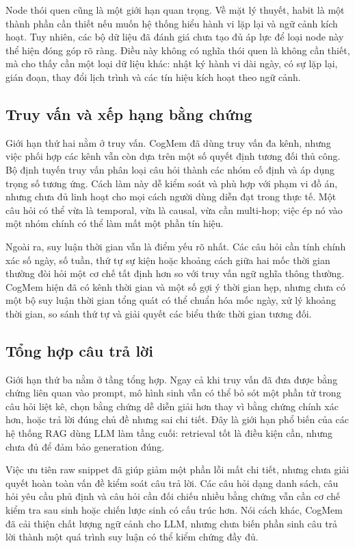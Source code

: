 \documentclass[../main.tex]{subfiles}
\begin{document}
Node thói quen cũng là một giới hạn quan trọng. Về mặt lý thuyết, habit là một thành phần cần thiết nếu muốn hệ thống hiểu hành vi lặp lại và ngữ cảnh kích hoạt. Tuy nhiên, các bộ dữ liệu đã đánh giá chưa tạo đủ áp lực để loại node này thể hiện đóng góp rõ ràng. Điều này không có nghĩa thói quen là không cần thiết, mà cho thấy cần một loại dữ liệu khác: nhật ký hành vi dài ngày, có sự lặp lại, gián đoạn, thay đổi lịch trình và các tín hiệu kích hoạt theo ngữ cảnh.

\subsection{Truy vấn và xếp hạng bằng chứng}

Giới hạn thứ hai nằm ở truy vấn. CogMem đã dùng truy vấn đa kênh, nhưng việc phối hợp các kênh vẫn còn dựa trên một số quyết định tương đối thủ công. Bộ định tuyến truy vấn phân loại câu hỏi thành các nhóm cố định và áp dụng trọng số tương ứng. Cách làm này dễ kiểm soát và phù hợp với phạm vi đồ án, nhưng chưa đủ linh hoạt cho mọi cách người dùng diễn đạt trong thực tế. Một câu hỏi có thể vừa là temporal, vừa là causal, vừa cần multi-hop; việc ép nó vào một nhóm chính có thể làm mất một phần tín hiệu.

Ngoài ra, suy luận thời gian vẫn là điểm yếu rõ nhất. Các câu hỏi cần tính chính xác số ngày, số tuần, thứ tự sự kiện hoặc khoảng cách giữa hai mốc thời gian thường đòi hỏi một cơ chế tất định hơn so với truy vấn ngữ nghĩa thông thường. CogMem hiện đã có kênh thời gian và một số gợi ý thời gian hẹp, nhưng chưa có một bộ suy luận thời gian tổng quát có thể chuẩn hóa mốc ngày, xử lý khoảng thời gian, so sánh thứ tự và giải quyết các biểu thức thời gian tương đối.

\subsection{Tổng hợp câu trả lời}

Giới hạn thứ ba nằm ở tầng tổng hợp. Ngay cả khi truy vấn đã đưa được bằng chứng liên quan vào prompt, mô hình sinh vẫn có thể bỏ sót một phần tử trong câu hỏi liệt kê, chọn bằng chứng dễ diễn giải hơn thay vì bằng chứng chính xác hơn, hoặc trả lời đúng chủ đề nhưng sai chi tiết. Đây là giới hạn phổ biến của các hệ thống RAG dùng LLM làm tầng cuối: retrieval tốt là điều kiện cần, nhưng chưa đủ để đảm bảo generation đúng.

Việc ưu tiên raw snippet đã giúp giảm một phần lỗi mất chi tiết, nhưng chưa giải quyết hoàn toàn vấn đề kiểm soát câu trả lời. Các câu hỏi dạng danh sách, câu hỏi yêu cầu phủ định và câu hỏi cần đối chiếu nhiều bằng chứng vẫn cần cơ chế kiểm tra sau sinh hoặc chiến lược sinh có cấu trúc hơn. Nói cách khác, CogMem đã cải thiện chất lượng ngữ cảnh cho LLM, nhưng chưa biến phần sinh câu trả lời thành một quá trình suy luận có thể kiểm chứng đầy đủ.
\end{document}
